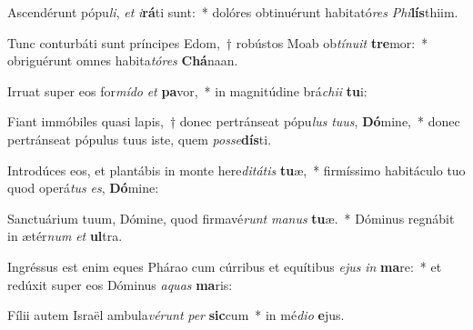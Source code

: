 \item Ascendérunt pópu\textit{li}, \textit{et} \textit{i}\textbf{rá}ti sunt:~* dolóres obtinuérunt habitató\textit{res} \textit{Phi}\textbf{lís}thiim.
\item Tunc conturbáti sunt príncipes Edom,~† robústos Moab ob\textit{tí}\textit{nu}\textit{it} \textbf{tre}mor:~* obriguérunt omnes habita\textit{tó}\textit{res} \textbf{Chá}naan.
\item Irruat super eos for\textit{mí}\textit{do} \textit{et} \textbf{pa}vor,~* in magnitúdine brá\textit{chi}\textit{i} \textbf{tu}i:
\item Fiant immóbiles quasi lapis,~† donec pertránseat pópu\textit{lus} \textit{tu}\textit{us}, \textbf{Dó}mine,~* donec pertránseat pópulus tuus iste, quem \textit{pos}\textit{se}\textbf{dís}ti.
\item Introdúces eos, et plantábis in monte here\textit{di}\textit{tá}\textit{tis} \textbf{tu}æ,~* firmíssimo habitáculo tuo quod operá\textit{tus} \textit{es}, \textbf{Dó}mine:
\item Sanctuárium tuum, Dómine, quod firmavé\textit{runt} \textit{ma}\textit{nus} \textbf{tu}æ.~* Dóminus regnábit in ætér\textit{num} \textit{et} \textbf{ul}tra.
\item Ingréssus est enim eques Phárao cum cúrribus et equítibus \textit{e}\textit{jus} \textit{in} \textbf{ma}re:~* et redúxit super eos Dóminus \textit{a}\textit{quas} \textbf{ma}ris:
\item Fílii autem Israël ambula\textit{vé}\textit{runt} \textit{per} \textbf{sic}cum~* in mé\textit{di}\textit{o} \textbf{e}jus.
